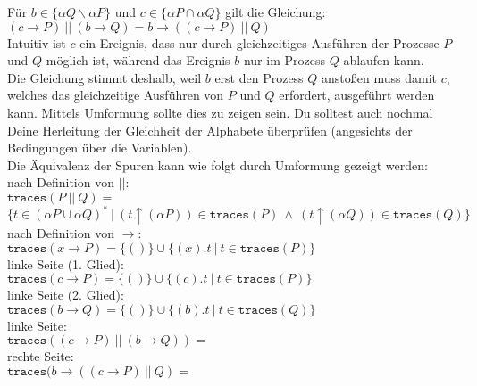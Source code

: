 Für $b \in \{\alpha Q \backslash \alpha P\}$ und $c \in \{\alpha P \cap \alpha Q\}$ gilt die Gleichung:\\
$(c \to P) \ || \ (b \to Q) = b \to ((c \to P) \ || \ Q)$\\

Intuitiv ist $c$ ein Ereignis, dass nur durch gleichzeitiges Ausführen der Prozesse $P$ und $Q$ möglich ist, während das Ereignis $b$ nur im Prozess $Q$ ablaufen kann.\\

Die Gleichung stimmt deshalb, weil $b$ erst den Prozess $Q$ anstoßen muss damit $c$, welches das gleichzeitige Ausführen von $P$ und $Q$ erfordert, ausgeführt werden kann. Mittels Umformung sollte dies zu zeigen sein. Du solltest auch nochmal Deine Herleitung der Gleichheit der Alphabete überprüfen (angesichts der Bedingungen über die Variablen).\\

Die Äquivalenz der Spuren kann wie folgt durch Umformung gezeigt werden:\\
nach Definition von $||$:\\
$\texttt{traces}(P \ || \ Q) = $\\$\{ t \in (\alpha P \cup \alpha Q)^* \ | \ (t \uparrow (\alpha P)) \in \texttt{traces}(P) \ \land \ (t \uparrow (\alpha Q)) \in \texttt{traces}(Q) \}$\\
nach Definition von $\to$:\\
$\texttt{traces}(x \to P) = \{ () \} \cup \{ (x).t \ | \ t \in \texttt{traces}(P)\}$\\
linke Seite (1. Glied):\\
$\texttt{traces}(c \to P) = \{ () \} \cup \{ (c).t \ | \ t \in \texttt{traces}(P)\}$\\
linke Seite (2. Glied):\\
$\texttt{traces}(b \to Q) = \{ () \} \cup \{ (b).t \ | \ t \in \texttt{traces}(Q)\}$\\
linke Seite:\\
$\texttt{traces}((c \to P) \ || \ (b \to Q)) = $\\
rechte Seite:\\
$\texttt{traces}(b \to ((c \to P) \ || \ Q) = $\\